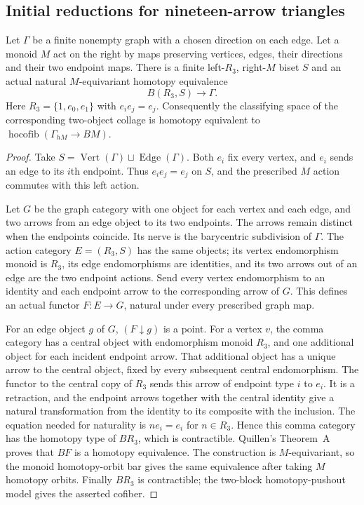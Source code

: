 \subsection{Initial reductions for nineteen-arrow triangles}

\begin{lemma}
\label{CP2:A-directed-graph-right-zero-realization}
Let $\Gamma$ be a finite nonempty graph with a chosen direction on
each edge.  Let a monoid $M$ act on the right by maps preserving
vertices, edges, their directions and their two endpoint maps.
There is a finite left-$R_3$, right-$M$ biset $S$ and an actual
natural $M$-equivariant homotopy equivalence
\[
 B(R_3,S)\longrightarrow\Gamma.
\]
Here $R_3=\{1,e_0,e_1\}$ with $e_i e_j=e_j$.
Consequently the classifying space of the corresponding two-object
collage is homotopy equivalent to
$\operatorname{hocofib}(\Gamma_{hM}\to BM)$.
\end{lemma}
\begin{proof}
Take $S=\operatorname{Vert}(\Gamma)\sqcup\operatorname{Edge}(\Gamma)$.
Both $e_i$ fix every vertex, and $e_i$ sends an edge to its $i$th
endpoint.  Thus $e_i e_j=e_j$ on $S$, and the prescribed $M$ action
commutes with this left action.

Let $G$ be the graph category with one object for each vertex and
each edge, and two arrows from an edge object to its two endpoints.
The arrows remain distinct when the endpoints coincide.  Its nerve
is the barycentric subdivision of $\Gamma$.
The action category $E=(R_3,S)$ has the same objects; its vertex
endomorphism monoid is $R_3$, its edge endomorphisms are identities,
and its two arrows out of an edge are the two endpoint actions.
Send every vertex endomorphism to an identity and each endpoint
arrow to the corresponding arrow of $G$.  This defines an actual
functor $F:E\to G$, natural under every prescribed graph map.

For an edge object $g$ of $G$, $(F\downarrow g)$ is a point.
For a vertex $v$, the comma category has a central object with
endomorphism monoid $R_3$, and one additional object for each
incident endpoint arrow.  That additional object has a unique
arrow to the central object, fixed by every subsequent central
endomorphism.  The functor to the central copy of $R_3$ sends
this arrow of endpoint type $i$ to $e_i$.  It is a retraction,
and the endpoint arrows together with the central identity give
a natural transformation from the identity to its composite with
the inclusion.  The equation needed for naturality is
$ne_i=e_i$ for $n\in R_3$.
Hence this comma category has the homotopy type of $BR_3$, which
is contractible.  Quillen's Theorem~A proves that $BF$ is a
homotopy equivalence.  The construction is $M$-equivariant, so
the monoid homotopy-orbit bar gives the same equivalence after
taking $M$ homotopy orbits.  Finally $BR_3$ is contractible;
the two-block homotopy-pushout model gives the asserted cofiber.
\end{proof}

